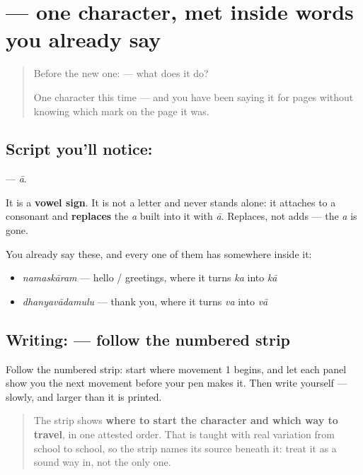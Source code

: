\section[\texorpdfstring{\te{ా} (ā)}{ా (ā)}]{ — one character, met inside words you already say}

\label{lesson:TE-S07-vowel-sign-aa}



\begin{quote}
Before the new one:  — what does it do?

One character this time — and you have been saying it for pages without knowing which mark on the page it was.
\end{quote}

\subsection*{Script you'll notice: }
\textbf{} — \emph{ā}.

It is a \textbf{vowel sign}. It is not a letter and never stands alone: it attaches to a consonant and \textbf{replaces} the \emph{a} built into it with \emph{ā}. Replaces, not adds — the \emph{a} is gone.

You already say these, and every one of them has  somewhere inside it:

\begin{itemize}
\raggedright
  \item \emph{namaskāram} — hello / greetings, where it turns \textbf{} \emph{ka} into \textbf{} \emph{kā}
  \item \emph{dhanyavādamulu} — thank you, where it turns \textbf{} \emph{va} into \textbf{} \emph{vā}
\end{itemize}

\subsection*{Writing:  — follow the numbered strip}

Follow the numbered strip: start where movement 1 begins, and let each panel show you the next movement before your pen makes it. Then write  yourself — slowly, and larger than it is printed.

\begin{quote}
The strip shows \textbf{where to start the character and which way to travel}, in one attested order. That is taught with real variation from school to school, so the strip names its source beneath it: treat it as a sound way in, not the only one.
\end{quote}

